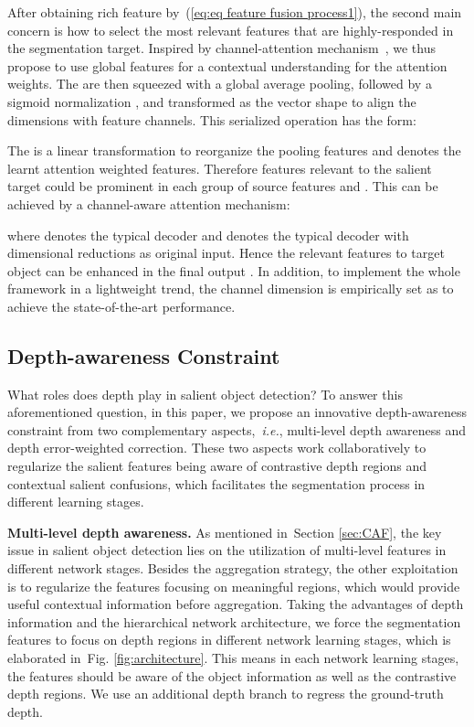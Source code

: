 \documentclass[sigconf]{acmart}
\def\ie{{\em i.e.}}
\newcommand{\figref}[1]{Fig. \ref{#1}}
\newcommand{\equref}[1]{(\ref{#1})}
\newcommand{\secref}[1]{Section \ref{#1}}
\begin{document}
After obtaining rich feature  by~\equref{eq:eq feature fusion process1}, the second main concern is how to select the most relevant features that are highly-responded in the segmentation target. Inspired by channel-attention mechanism~\cite{hu2018squeeze,chen2017sca}, we thus propose to use global features for a contextual understanding for the attention weights. The  are then squeezed with a global average pooling, followed by a sigmoid normalization , and transformed as the vector shape to align the dimensions with feature channels.
This serialized operation has the form:


The  is a linear transformation to reorganize the pooling features and  denotes the learnt attention weighted features. Therefore features relevant to the salient target could be prominent in each group of source features  and . This can be achieved by a channel-aware attention mechanism:

where  denotes the typical decoder and  denotes the typical decoder with dimensional reductions as original input. Hence the relevant features to target object can be enhanced in the final output . 
In addition, to implement the whole framework in a lightweight trend, the channel dimension  is empirically set as  to achieve the state-of-the-art performance.




\subsection{Depth-awareness Constraint}

What roles does depth play in salient object detection? To answer this aforementioned question, in this paper, we propose an innovative depth-awareness constraint from two complementary aspects,~\ie, multi-level depth awareness and depth error-weighted correction. These two aspects work collaboratively to regularize the salient features being aware of contrastive depth regions and contextual salient confusions, which facilitates the segmentation process in different learning stages.

\textbf{Multi-level depth awareness.} As mentioned in~\secref{sec:CAF}, the key issue in salient object detection lies on the utilization of multi-level features in different network stages. Besides the aggregation strategy, the other exploitation is to regularize the features focusing on meaningful regions, which would provide useful contextual information before aggregation. Taking the advantages of depth information and the hierarchical network architecture, we force the segmentation features to focus on depth regions in different network learning stages, which is elaborated in~\figref{fig:architecture}. This means in each network learning stages, the features should be aware of the object information as well as the contrastive depth regions. We use an additional depth branch to regress the ground-truth depth.
\end{document}
